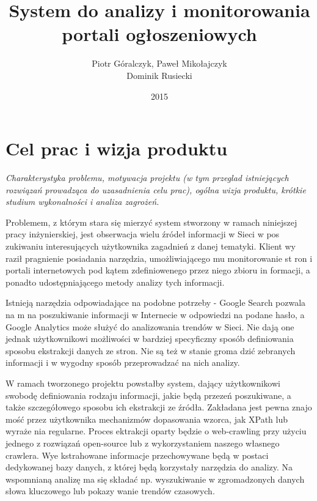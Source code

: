 \documentclass[polish,12pt]{aghthesis}
\author{Piotr Góralczyk, Paweł Mikołajczyk\\ Dominik Rusiecki}
\title{System do analizy i monitorowania\\ portali ogłoszeniowych}
\date{2015}
\begin{document}
\maketitle



\section{Cel prac i wizja produktu}
\label{sec:cel-wizja}
\emph{Charakterystyka problemu, motywacja projektu (w tym przeglad
  istniejących rozwiązań prowadząca do uzasadnienia celu prac), ogólna
  wizja produktu, krótkie studium wykonalności i analiza zagrożeń.}

Problemem, z którym stara się mierzyć system stworzony w ramach niniejszej
pracy inżynierskiej, jest obserwacja wielu źródeł informacji w Sieci w pos
zukiwaniu interesujących użytkownika zagadnień z danej tematyki. Klient wy
raził pragnienie posiadania narzędzia, umożliwiającego mu monitorowanie st
ron i portali internetowych pod kątem zdefiniowenego przez niego zbioru in
formacji, a ponadto udostępniającego metody analizy tych informacji. 

Istnieją narzędzia odpowiadające na podobne potrzeby - Google Search pozwala na
m na poszukiwanie informacji w Internecie w odpowiedzi na podane hasło, a
Google Analytics może służyć do analizowania trendów w Sieci.
Nie dają one jednak użytkownikowi możliwości w bardziej specyficzny sposób
 definiowania sposobu ekstrakcji danych ze stron. Nie są też w stanie groma
dzić zebranych informacji i w wygodny sposób przeprowadzać na nich analizy. 

W ramach tworzonego projektu powstałby system, dający użytkownikowi swobodę
definiowania rodzaju informacji, jakie będą przezeń poszukiwane, a także 
szczegółowego sposobu ich ekstrakcji ze źródła. Zakładana jest pewna znajo
mość przez użytkownika mechanizmów dopasowania wzorca, jak XPath lub wyraże
nia regularne. Proces ektrakcji oparty będzie o web-crawling przy użyciu jednego
z rozwiązań open-source lub z wykorzystaniem naszego własnego crawlera. Wye
kstrahowane informacje przechowywane będą w postaci dedykowanej bazy danych, 
z której będą korzystały narzędzia do analizy. Na wspomnianą analizę ma się 
składać np. wyszukiwanie w zgromadzonych danych słowa kluczowego lub pokazy
wanie trendów czasowych.
\end{document}
